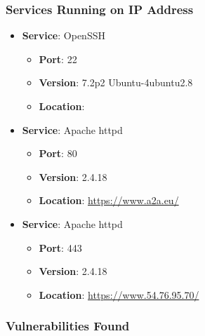 \documentclass{article}
\begin{document}
\subsubsection*{Services Running on IP Address}

\begin{itemize}
    
        \item \textbf{Service}: OpenSSH
        \begin{itemize}
            \item \textbf{Port}: 22
            \item \textbf{Version}:  7.2p2 Ubuntu-4ubuntu2.8 
            \item \textbf{Location}: \href{  }{  }
        \end{itemize}
    
        \item \textbf{Service}: Apache httpd
        \begin{itemize}
            \item \textbf{Port}: 80
            \item \textbf{Version}:  2.4.18 
            \item \textbf{Location}: \href{ https://www.a2a.eu/ }{ https://www.a2a.eu/ }
        \end{itemize}
    
        \item \textbf{Service}: Apache httpd
        \begin{itemize}
            \item \textbf{Port}: 443
            \item \textbf{Version}:  2.4.18 
            \item \textbf{Location}: \href{ https://www.54.76.95.70/ }{ https://www.54.76.95.70/ }
        \end{itemize}
    
\end{itemize}


\subsubsection*{Vulnerabilities Found}
\end{document}
